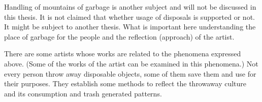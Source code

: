 Handling of mountains of garbage is another subject and will not be discussed in this thesis. It is not claimed that whether usage of disposals is supported or not. It might be subject to another thesis. What is important here understanding the place of garbage for the people and the reflection (approach) of the artist. 







%
%
There are some artists whose works are related to the phenomena expressed above. (Some of the works of the artist can be examined in this phenomena.) Not every person throw away disposable objects, some of them save them and use for their purposes. They establish some methods to reflect the throwaway culture and its consumption and trash generated patterns. 


